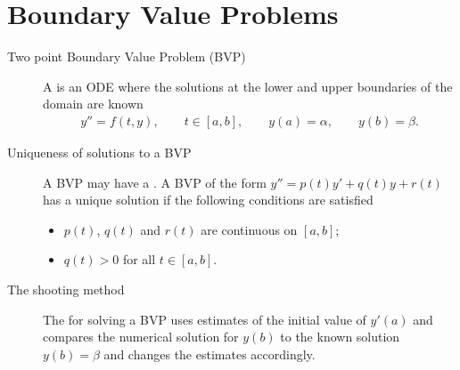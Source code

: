 \documentclass[letterpaper,10pt,english]{jupyterBook}
\begin{document}
\section{Boundary Value Problems}
\label{\detokenize{8_Appendices/8.0_Cheat_sheet:boundary-value-problems}}\begin{description}
\item[{Two point Boundary Value Problem (BVP)\label{\detokenize{8_Appendices/8.0_Cheat_sheet:term-Two-point-Boundary-Value-Problem-BVP}}}] \leavevmode
\sphinxAtStartPar
A {\hyperref[\detokenize{5_BVPs/5.0_BVPs:bvp-section}]{}} is an ODE where the solutions at the lower and upper boundaries of the domain are known
\begin{equation*}
\begin{split}y'' = f(t, y), \qquad t \in [a, b], \qquad y(a) = \alpha, \qquad y(b) = \beta.\end{split}
\end{equation*}
\item[{Uniqueness of solutions to a BVP\label{\detokenize{8_Appendices/8.0_Cheat_sheet:term-Uniqueness-of-solutions-to-a-BVP}}}] \leavevmode
\sphinxAtStartPar
A BVP may have a {\hyperref[\detokenize{5_BVPs/5.0_BVPs:existence-and-uniqueness-of-bvp-solutions-section}]{}}. A BVP of the form \(y'' = p(t) y' + q(t) y + r(t)\) has a unique solution if the following conditions are satisfied
\begin{itemize}
\item {} 
\sphinxAtStartPar
\(p(t)\), \(q(t)\) and \(r(t)\) are continuous on \([a, b]\);

\item {} 
\sphinxAtStartPar
\(q(t) > 0\) for all \(t\in [a,b]\).

\end{itemize}

\item[{The shooting method\label{\detokenize{8_Appendices/8.0_Cheat_sheet:term-The-shooting-method}}}] \leavevmode
\sphinxAtStartPar
The {\hyperref[\detokenize{5_BVPs/5.1_Shooting_method:shooting-method-section}]{}} for solving a BVP uses estimates of the initial value of \(y'(a)\) and compares the numerical solution for \(y(b)\) to the known solution \(y(b)=\beta\) and changes the estimates accordingly.


\end{description}
\end{document}

